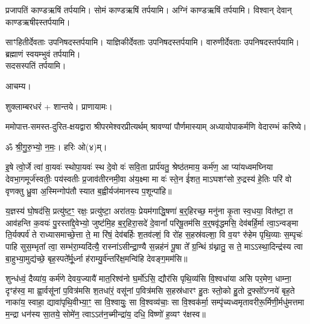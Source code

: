 प्रजापतिं काण्डऋषिं तर्पयामि। 
सोमं काण्डऋषिं तर्पयामि। 
अग्निं काण्डऋषिं तर्पयामि। 
विश्वान् देवान् काण्डऋषीꣴ\-स्तर्पयामि।

साꣳहितीर्देवताः उपनिषद\-स्तर्पयामि। 
याज्ञिकीर्देवताः उपनिषद\-स्तर्पयामि। 
वारुणीर्देवताः उपनिषद\-स्तर्पयामि। 
ब्रह्माणं स्वयम्भुवं तर्पयामि। %
\\
सदसस्पतिं तर्पयामि।

आचम्य।







शुक्लाम्बरधरं + शान्तये। प्राणायामः।

ममोपात्त-समस्त-दुरित-क्षयद्वारा श्रीपरमेश्वरप्रीत्यर्थम्
श्रावण्यां पौर्णमास्याम् अध्यायोपाकर्मणि वेदारम्भं करिष्ये।


ॐ श्री॒गु॒रु॒भ्यो॒ न॒मः॒। हरिः ओ(४)म्।

इ॒षे त्वो॒र्जे त्वा॑ वा॒यवः॑ स्थोपा॒यवः॑ स्थ दे॒वो वः॑ सवि॒ता प्रार्प॑यतु॒ श्रेष्ठ॑तमाय॒ कर्म॑ण॒ आ प्या॑यध्वमघ्निया देवभा॒गमूर्ज॑स्वतीः॒ पय॑स्वतीः प्र॒जाव॑तीरनमी॒वा अ॑य॒क्ष्मा मा वः॑ स्ते॒न ई॑शत॒ मा\-ऽघशꣳ॑सो रु॒द्रस्य॑ हे॒तिः परि॑ वो वृणक्तु ध्रु॒वा अ॒स्मिन्गोप॑तौ स्यात ब॒ह्वीर्यज॑मानस्य प॒शून्पा॑हि॥

य॒ज्ञस्य॑ घो॒षद॑सि॒ प्रत्यु॑ष्ट॒ꣳ॒ रक्षः॒ प्रत्यु॑ष्टा॒ अरा॑तयः॒ प्रेयम॑गाद्धि॒षणा॑ ब॒र्॒हिरच्छ॒ मनु॑ना कृ॒ता स्व॒धया॒ वित॑ष्टा॒ त आव॑हन्ति क॒वयः॑ पु॒रस्ता᳚द्दे॒वेभ्यो॒ जुष्ट॑मि॒ह ब॒र्॒हिरा॒सदे॑ दे॒वानां᳚ परिषू॒तम॑सि व॒र्॒षवृ॑द्धमसि॒ देव॑बर्\mbox{}हि॒र्मा त्वा॒\-ऽन्वङ्मा ति॒र्यक्पर्व॑ ते राध्यासमाच्छे॒त्ता ते॒ मा रि॑षं॒ देव॑बर्\mbox{}हिः श॒तव॑ल्\mbox{}शं॒ वि रो॑ह स॒हस्र॑वल्\mbox{}शा॒ वि व॒यꣳ रु॑हेम पृथि॒व्याः स॒म्पृचः॑ पाहि सुस॒म्भृता᳚ त्वा॒ सम्भ॑रा॒म्यदि॑त्यै॒ रास्ना॑\-ऽसीन्द्रा॒ण्यै स॒न्नह॑नं पू॒षा ते᳚ ग्र॒न्थिं ग्र॑थ्नातु॒ स ते॒ मा\-ऽऽ\-स्था॒दिन्द्र॑स्य त्वा बा॒हुभ्या॒मुद्य॑च्छे॒ बृह॒स्पते᳚र्मू॒र्ध्ना ह॑राम्यु॒र्व॑न्तरि॑क्ष॒मन्वि॑हि देवङ्ग॒मम॑सि॥

शुन्ध॑ध्वं॒ दैव्या॑य॒ कर्म॑णे देवय॒ज्यायै॑ मात॒रिश्व॑नो घ॒र्मो॑ऽसि॒ द्यौर॑सि पृथि॒व्य॑सि वि॒श्वधा॑या
असि पर॒मेण॒ धाम्ना॒ दृꣳह॑स्व॒ मा ह्वा॒र्वसू॑नां प॒वित्र॑मसि श॒तधा॑रं॒ वसू॑नां प॒वित्र॑मसि
स॒हस्र॑धारꣳ हु॒तः स्तो॒को हु॒तो द्र॒फ्सो᳚ऽग्नये॑ बृह॒ते नाका॑य॒ स्वाहा॒ द्यावा॑पृथि॒वीभ्या॒ꣳ॒ सा
वि॒श्वायुः॒ सा वि॒श्वव्य॑चाः॒ सा वि॒श्वक॑र्मा॒ सम्पृ॑च्यध्वमृतावरीरू॒र्मिणी॒र्मधु॑मत्तमा म॒न्द्रा
धन॑स्य सा॒तये॒ सोमे॑न॒ त्वाऽऽत॑न॒च्मीन्द्रा॑य॒ दधि॒ विष्णो॑ ह॒व्यꣳ र॑क्षस्व॥ 

